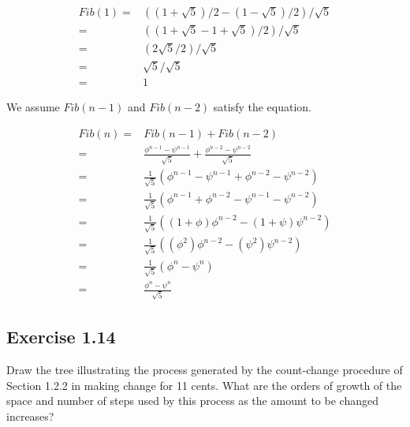 \documentclass[letterpaper, leqno]{article}
\begin{document}
{\color{answer}
\begin{align*}
Fib(1) =& ((1+\sqrt{5})/2 - (1-\sqrt{5})/2)/\sqrt{5} \\
       =& ((1+\sqrt{5} - 1 + \sqrt{5})/2)/\sqrt{5} \\
       =& (2\sqrt{5}/2)/\sqrt{5} \\
       =& \sqrt{5}/\sqrt{5} \\
       =& 1
\end{align*}
}

\textcolor{answer}{
We assume $Fib(n-1)$ and $Fib(n-2)$ satisfy the equation.
}

{\color{answer}
\begin{align*}
Fib(n) =& Fib(n-1) + Fib(n-2) \\
=& \frac{\phi^{n-1}-\psi^{n-1}}{\sqrt{5}} + \frac{\phi^{n-2}-\psi^{n-2}}{\sqrt{5}} \\
=& \frac{1}{\sqrt{5}}(\phi^{n-1}-\psi^{n-1}+\phi^{n-2}-\psi^{n-2}) \\
=& \frac{1}{\sqrt{5}}(\phi^{n-1}+\phi^{n-2}-\psi^{n-1}-\psi^{n-2}) \\
=& \frac{1}{\sqrt{5}}((1+\phi)\phi^{n-2}-(1+\psi)\psi^{n-2}) \\
=& \frac{1}{\sqrt{5}}((\phi^2)\phi^{n-2}-(\psi^2)\psi^{n-2}) \\
=& \frac{1}{\sqrt{5}}(\phi^n-\psi^n) \\
=& \frac{\phi^n - \psi^n}{\sqrt{5}}
\end{align*}
}

\subsection*{Exercise 1.14}
Draw the tree illustrating the process generated by the count-change procedure of Section 1.2.2 in making change for 11 cents. What are the orders of growth of the space and number of steps used by this process as the amount to be changed increases?




\end{document}
